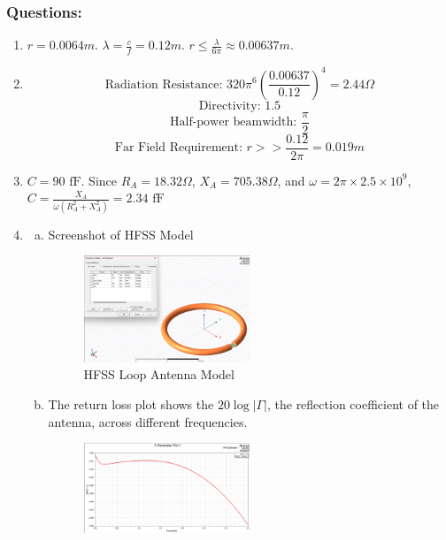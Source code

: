 \documentclass{article} %
\begin{document}
\subsubsection*{Questions:}
\begin{enumerate}[]
    \item $r = 0.0064 \si{m}$. $\lambda = \frac{c}{f} = 0.12 \si{m}$. $r \leq \frac{\lambda}{6 \pi} \approx 0.00637 \si{m}$.
    \item
          \[\text{Radiation Resistance: }320 \pi^6 \left(\frac{0.00637}{0.12}\right)^4 = 2.44 \Omega \]
          \[\text{Directivity: } 1.5\]
          \[\text{Half-power beamwidth: } \frac{\pi}{2}\]
          \[\text{Far Field Requirement: } r >> \frac{0.12}{2\pi} = 0.019 \si{m}\]
    \item $C = 90 \text{ fF}$. Since $R_A = 18.32 \Omega$, $X_A = 705.38 \Omega$, and $\omega = 2 \pi \times 2.5 \times 10^9$, $C = \frac{X_{A}}{\omega (R_{A}^{2}+X_{A}^{2})} = 2.34 \text{ fF}$
    \item
          \begin{enumerate}[(a)]
              \item Screenshot of HFSS Model
                    \begin{figure}[H]
                        \centering
                        \includegraphics[width=0.5\textwidth]{./image/figure1.png}
                        \caption{HFSS Loop Antenna Model}
                    \end{figure}
              \item The return loss plot shows the $20 \log |\Gamma| $, the reflection coefficient of the antenna, across different frequencies.
                    \begin{figure}[H]
                        \centering
                        \includegraphics[width=0.5\textwidth]{./image/figure2.png}

\end{figure}
\end{enumerate}
\end{enumerate}
\end{document}

